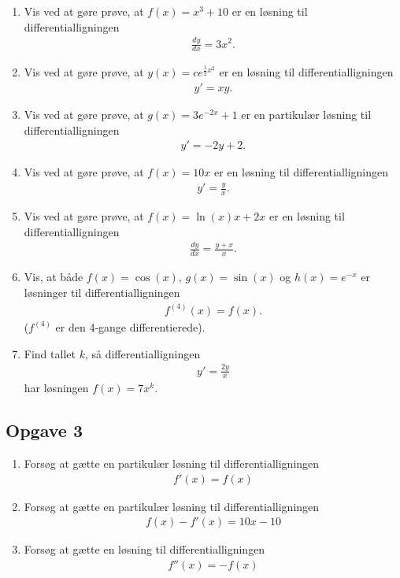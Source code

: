 \begin{enumerate}[label=\roman*)]
	\item Vis ved at gøre prøve, at $f(x) = x^3 + 10$ er en løsning til differentialligningen
	\begin{align*}
		\frac{dy}{dx} = 3x^2.
	\end{align*}
	\item Vis ved at gøre prøve, at $y(x) = ce^{\frac{1}{2}x^2}$ er en løsning til differentialligningen
	\begin{align*}
		y' = xy.
	\end{align*}
	\item Vis ved at gøre prøve, at $g(x) = 3e^{-2x} + 1$ er en partikulær løsning til differentialligningen
	\begin{align*}
		y' = -2y+2.
	\end{align*}
	\item Vis ved at gøre prøve, at $f(x) = 10x$ er en løsning til differentialligningen
	\begin{align*}
		y' = \frac{y}{x}.
	\end{align*}
	\item Vis ved at gøre prøve, at $f(x) = \ln(x)x + 2x$ er en løsning til differentialligningen
	\begin{align*}
		\frac{dy}{dx} = \frac{y + x}{x}.
	\end{align*}
	\item Vis, at både $f(x) = \cos(x)$, $g(x) = \sin(x)$ og $h(x) = e^{-x}$ er løsninger til differentialligningen
	\begin{align*}
		f^{(4)}(x) = f(x).
	\end{align*}
	($f^{(4)}$ er den 4-gange differentierede).
	\item Find tallet $k$, så differentialligningen
	\begin{align*}
		y' = \frac{2y}{x}
	\end{align*}
	har løsningen $f(x) = 7x^k$.
\end{enumerate}


\subsection*{Opgave 3}
\begin{enumerate}[label=\roman*)]
	\item Forsøg at gætte en partikulær løsning til differentialligningen 
	\begin{align*}
		f'(x) = f(x)
	\end{align*}
	\item Forsøg at gætte en partikulær løsning til differentialligningen
	\begin{align*}
		f(x) - f'(x) = 10x-10
	\end{align*}
	\item Forsøg at gætte en løsning til differentialligningen 
	\begin{align*}
		f''(x) = -f(x)
	\end{align*}
\end{enumerate}

